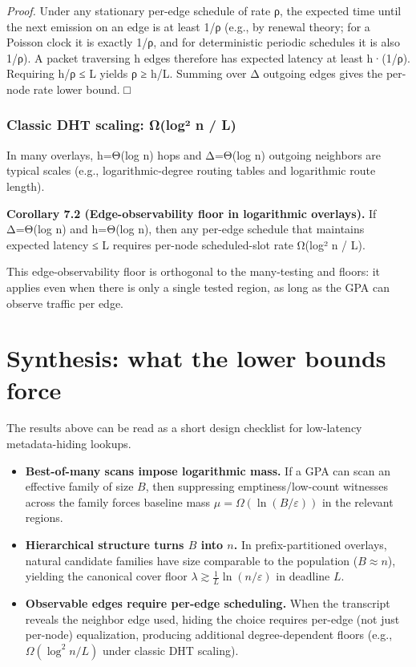 \documentclass[
 11pt,
]{article}
\providecommand{\tightlist}{%
 \setlength{\itemsep}{0pt}\setlength{\parskip}{0pt}}
\begin{document}
\emph{Proof.} Under any stationary per-edge schedule of rate ρ, the
expected time until the next emission on an edge is at least 1/ρ (e.g.,
by renewal theory; for a Poisson clock it is exactly 1/ρ, and for
deterministic periodic schedules it is also 1/ρ). A packet traversing h
edges therefore has expected latency at least h·(1/ρ). Requiring h/ρ ≤ L
yields ρ ≥ h/L. Summing over Δ outgoing edges gives the per-node rate
lower bound. □

\subsubsection{Classic DHT scaling: Ω(log² n /
L)}\label{classic-dht-scaling-ux3c9loguxb2-n-l}

In many overlays, h=Θ(log n) hops and Δ=Θ(log n) outgoing neighbors are
typical scales (e.g., logarithmic-degree routing tables and logarithmic
route length).

\textbf{Corollary 7.2 (Edge-observability floor in logarithmic
overlays).} If Δ=Θ(log n) and h=Θ(log n), then any per-edge schedule
that maintains expected latency ≤ L requires per-node scheduled-slot
rate Ω(log² n / L).

This edge-observability floor is orthogonal to the many-testing and 
 floors: it applies even when there is only a single tested
region, as long as the GPA can observe traffic per edge.

\section{Synthesis: what the lower bounds force}\label{synthesis}

The results above can be read as a short design checklist for low-latency
metadata-hiding lookups.

\begin{itemize}\tightlist
\item \textbf{Best-of-many scans impose logarithmic mass.} If a GPA can scan an effective family
of size $B$, then suppressing emptiness/low-count witnesses across the family forces baseline
mass $\mu=\Omega(\ln(B/\varepsilon))$ in the relevant regions.
\item \textbf{Hierarchical structure turns $B$ into $n$.} In prefix-partitioned overlays, natural
candidate families have size comparable to the population ($B\approx n$), yielding the canonical
cover floor $\lambda \gtrsim \frac{1}{L}\ln(n/\varepsilon)$ in deadline $L$.
\item \textbf{Observable edges require per-edge scheduling.} When the transcript reveals the neighbor
edge used, hiding the choice requires per-edge (not just per-node) equalization, producing additional
degree-dependent floors (e.g., $\Omega(\log^2 n/L)$ under classic DHT scaling).
\end{itemize}
\end{document}
